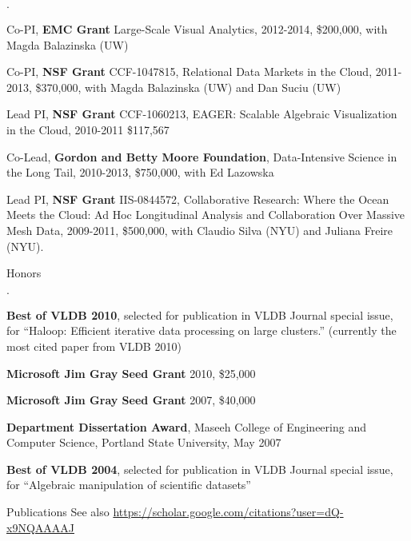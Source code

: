 \documentclass[10pt]{article}
\newenvironment{bulletlist}
   {
      \begin{list}
         {$\cdot$}
         {
            \setlength{\itemsep}{.7ex}
            \setlength{\parsep}{0ex}
            \setlength{\leftmargin}{0.7em}
            \setlength{\parskip}{0ex}
            \setlength{\topsep}{0ex}
         }
   }
   {
      \end{list}
   }
\newcommand{\marginlabel}[1]{
\begin{minipage}[b]{0.8\labelwidth}{\large \textsf{\textbf{#1}}}\end{minipage}}
\newcommand{\entrylabel}[1]{\mbox{\marginlabel{#1}}\hfill}
\newcommand{\MainListlabel}[1]
   {
      \parbox[t]{\labelwidth}{\hspace{.8em}\marginlabel{#1}}
   }
\newenvironment{MainList}[1]
   {
      \renewcommand{\entrylabel}{\MainListlabel}
      \begin{list}{}
      {
         \renewcommand{\makelabel}{\entrylabel}
         \setlength   {\itemindent}{-.65em}
         \setlength   {\labelwidth}{#1}
         \setlength   {\leftmargin}{\labelwidth}
         \setlength   {\itemsep}{3ex}
      }
   }
   {
      \end{list}
   }
\begin{document}
\begin{MainList}{88pt}
\begin{bulletlist}
\item Co-PI, {\bf EMC Grant} Large-Scale Visual Analytics, 2012-2014, \$200,000, with Magda Balazinska (UW)

\item Co-PI, {\bf NSF Grant} CCF-1047815, Relational Data Markets in the Cloud, 2011-2013, \$370,000, with Magda Balazinska (UW) and Dan Suciu (UW)

\item Lead PI, {\bf NSF Grant} CCF-1060213, EAGER: Scalable Algebraic Visualization in the Cloud, 2010-2011 \$117,567

\item Co-Lead, {\bf Gordon and Betty Moore Foundation}, Data-Intensive Science in the Long Tail, 2010-2013, \$750,000, with Ed Lazowska

\item Lead PI, {\bf NSF Grant} IIS-0844572, Collaborative Research: Where the Ocean Meets the Cloud: Ad Hoc Longitudinal Analysis and Collaboration Over Massive Mesh Data, 2009-2011, \$500,000, with Claudio Silva (NYU) and Juliana Freire (NYU).

\end{bulletlist}

\item [Honors]
\begin{bulletlist}


\item {\bf Best of VLDB 2010}, selected for publication in VLDB Journal special issue, for ``Haloop: Efficient iterative data processing on large clusters.'' (currently the most cited paper from VLDB 2010)

\item {\bf Microsoft Jim Gray Seed Grant} 2010, \$25,000

\item {\bf Microsoft Jim Gray Seed Grant} 2007, \$40,000

\item {\bf Department Dissertation Award}, Maseeh College of Engineering and Computer Science, Portland State University, May 2007

\item {\bf Best of VLDB 2004}, selected for publication in VLDB Journal special issue, for ``Algebraic manipulation of scientific datasets'' 

\end{bulletlist}

\item[Publications] 
See also \url{https://scholar.google.com/citations?user=dQ-x9NQAAAAJ}


\end{MainList}
\end{document}
